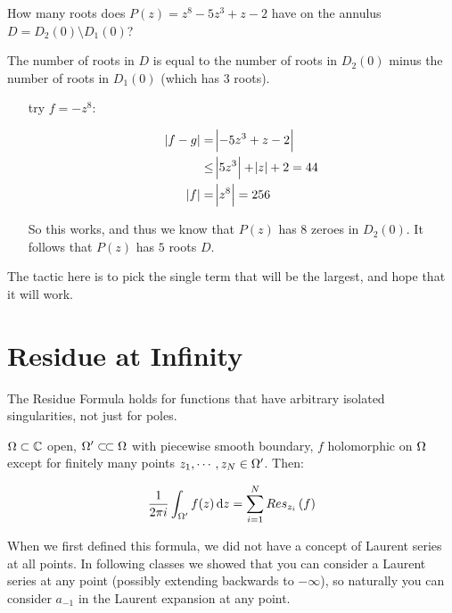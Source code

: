 \begin{example}
How many roots does $P(z) = z^8-5z^3+z-2$ have on the annulus $D=D_2(0) \setminus D_1(0)$?

The number of roots in $D$ is equal to the number of roots in $D_2(0)$ minus the number of roots in $D_1(0)$ (which has $3$ roots).


\begin{enumerate}
    \item[try] $f=-z^8$:
    
    \begin{align*}
        \abs{f-g} &= \abs{-5z^3+z-2}\\
        &\leq \abs{5z^3} + \abs{z} +2 = 44\\
        \abs{f} &= \abs{z^8} = 256
    \end{align*}
    
    So this works, and thus we know that $P(z)$ has $8$ zeroes in $D_2(0)$. It follows that $P(z)$ has $5$ roots $D$.

\end{enumerate}


\end{example}

\begin{note}

The tactic here is to pick the single term that will be the largest, and hope that it will work.

\end{note}




\section{Residue at Infinity}

\begin{remark}
The Residue Formula holds for functions that have arbitrary isolated singularities, not just for poles.
\end{remark}

\begin{theorem}
$\Omega \subset \mathbb{C}$ open, $\om ' \ssubset \om$ with piecewise smooth boundary, $f$ holomorphic on $\Omega$ except for finitely many points $z_1, \cdots , z_N \in \Omega '$. Then:

\begin{align*}
    \frac{1}{2 \pi i} \int_{\om '} f(z) \dif z = \sum_{i=1}^N \res{z_i}{f}
\end{align*}
\end{theorem}
\begin{note}
When we first defined this formula, we did not have a concept of Laurent series at all points. In following classes we showed that you can consider a Laurent series at any point (possibly extending backwards to $- \infty$), so naturally you can consider $a_{-1}$ in the Laurent expansion at any point.
\end{note}

